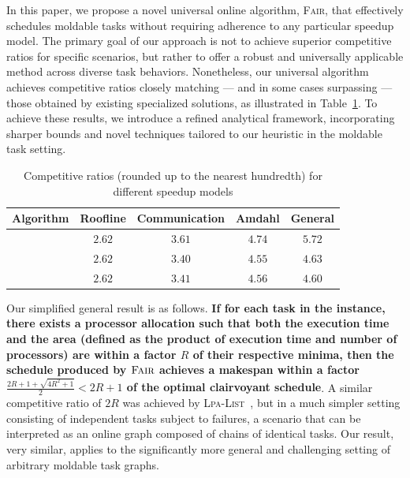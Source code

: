 \documentclass{article}
\newcommand\fair{\textsc{Fair}\xspace}
\newcommand\ratio{R\xspace}
\newcommand\lpalist{\textsc{Lpa-List}\xspace}
\begin{document}
In this paper, we propose a novel universal online algorithm, \fair, that effectively schedules moldable tasks without requiring adherence to any particular speedup model. The primary goal of our approach is not to achieve superior competitive ratios for specific scenarios, but rather to offer a robust and universally applicable method across diverse task behaviors. Nonetheless, our universal algorithm achieves competitive ratios closely matching — and in some cases surpassing — those obtained by existing specialized solutions, as illustrated in Table~\ref{tab.all-values}. To achieve these results, we introduce a refined analytical framework, incorporating sharper bounds and novel techniques tailored to our heuristic in the moldable task setting.
\begin{table}[h]
\centering
\caption{Competitive ratios (rounded up to the nearest hundredth) for different speedup models}
\label{tab.all-values}
\begin{tabular}{| c | c | c | c | c |}
\hline
\textbf{Algorithm} & Roofline & Communication & Amdahl & General \\
\hline
\cite{ICPP22} & $2.62$ & $3.61$ & $4.74$ & $5.72$ \\
\hline
\cite{TOPC24} & $2.62$ & $3.40$ & $4.55$ & $4.63$ \\
\hline
[This Paper] & $2.62$ & $3.41$ & $4.56$ & $4.60$ \\
\hline
\end{tabular}
\end{table}

Our simplified general result is as follows. \textbf{If for each task in the instance, there exists a processor allocation such that both the execution time and the area (defined as the product of execution time and number of processors) are within a factor $\ratio$ of their respective minima, then the schedule produced by $\fair$ achieves a makespan within a factor $\frac{2\ratio+1+\sqrt{4\ratio^2+1}}{2}<2\ratio + 1$ of the optimal clairvoyant schedule}.
 A similar competitive ratio of $2\ratio$ was achieved by \lpalist~\cite{Benoit20_cluster, Benoit21_ieeetc}, but in a much simpler setting consisting of independent tasks subject to failures, a scenario that can be interpreted as an online graph composed of chains of identical tasks. Our result, very similar, applies to the significantly more general and challenging setting of arbitrary moldable task graphs.
\end{document}
